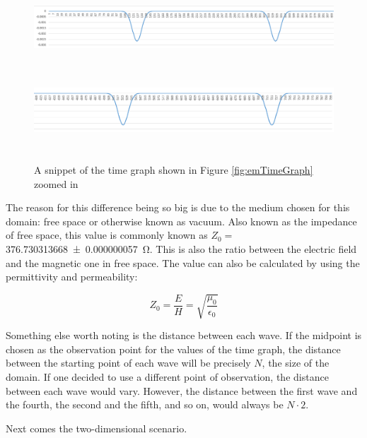 \begin{figure}[H]
	\centering
	\includegraphics[height= 3cm,width=\textwidth]{Figures/1DmagneticTimeGraph1}
	\includegraphics[height= 3cm,width=\textwidth]{Figures/1DmagneticTimeGraph2}
	\decoRule
	\caption[1D Magnetic Time Snippet]{A snippet of the time graph shown in Figure \ref{fig:emTimeGraph} zoomed in}
	\label{fig:mTimeSnippet}
\end{figure}

The reason for this difference being so big is due to the medium chosen for this domain: free space or otherwise known as vacuum. Also known as the impedance of free space, this value is commonly known as $Z_0 = $ \SI{376.730313668(57)}{\ohm}. This is also the ratio between the electric field and the magnetic one in free space. The value can also be calculated by using the permittivity and permeability:

\begin{equation}
	\label{eqn:impedance}
	Z_0 = \frac{E}{H} = \sqrt{\frac{\mu_0}{\epsilon_{0}}}
\end{equation}

Something else worth noting is the distance between each wave. If the midpoint is chosen as the observation point for the values of the time graph, the distance between the starting point of each wave will be precisely $N$, the size of the domain. If one decided to use a different point of observation, the distance between each wave would vary. However, the distance between the first wave and the fourth, the second and the fifth, and so on, would always be $N \cdot 2$. 

Next comes the two-dimensional scenario.
	